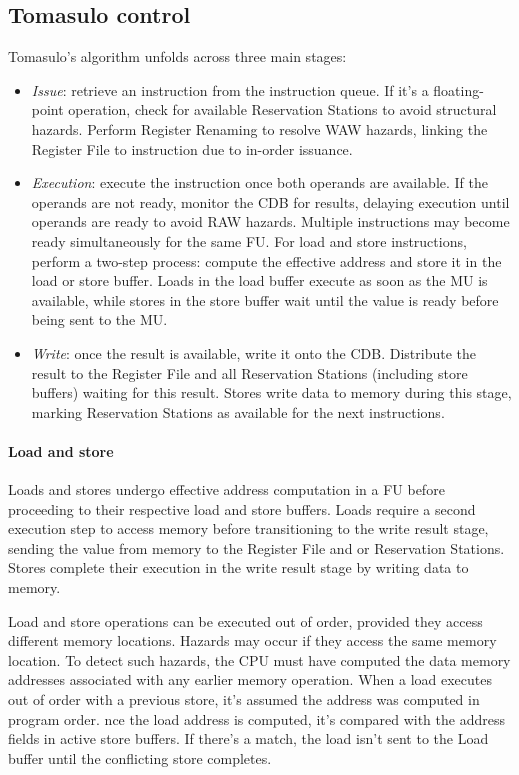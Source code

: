 \subsection{Tomasulo control}
Tomasulo's algorithm unfolds across three main stages:
\begin{itemize}
    \item \textit{Issue}: retrieve an instruction from the instruction queue.
        If it's a floating-point operation, check for available Reservation Stations to avoid structural hazards.
        Perform Register Renaming to resolve WAW hazards, linking the Register File to instruction due to in-order issuance.
    \item \textit{Execution}: execute the instruction once both operands are available.
        If the operands are not ready, monitor the CDB for results, delaying execution until operands are ready to avoid RAW hazards.
        Multiple instructions may become ready simultaneously for the same FU.
        For load and store instructions, perform a two-step process: compute the effective address and store it in the load or store buffer. 
        Loads in the load buffer execute as soon as the MU is available, while stores in the store buffer wait until the value is ready before being sent to the MU.
    \item \textit{Write}: once the result is available, write it onto the CDB. 
        Distribute the result to the Register File and all Reservation Stations (including store buffers) waiting for this result. 
        Stores write data to memory during this stage, marking Reservation Stations as available for the next instructions.
\end{itemize}

\paragraph*{Load and store}
Loads and stores undergo effective address computation in a FU before proceeding to their respective load and store buffers. 
Loads require a second execution step to access memory before transitioning to the write result stage, sending the value from memory to the Register File and or Reservation Stations.
Stores complete their execution in the write result stage by writing data to memory. 

Load and store operations can be executed out of order, provided they access different memory locations. 
Hazards may occur if they access the same memory location.
To detect such hazards, the CPU must have computed the data memory addresses associated with any earlier memory operation. 
When a load executes out of order with a previous store, it's assumed the address was computed in program order.
nce the load address is computed, it's compared with the address fields in active store buffers. 
If there's a match, the load isn't sent to the Load buffer until the conflicting store completes.

